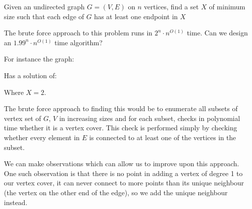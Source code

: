 \documentclass{article}
\begin{document}
\begin{definition}
  Given an undirected graph $G = (V,E)$ on $n$ vertices, find a set $X$ of minimum size such that each edge of $G$ has at least one endpoint in $X$
\end{definition}

The brute force approach to this problem runs in $2^{n}\cdot n^{O(1)}$ time. Can we design an $1.99^{n} \cdot n^{O(1)}$ time algorithm?

For instance the graph:


Has a solution of:


Where $X=2$.

The brute force approach to finding this would be to enumerate all subsets of vertex set of $G$, $V$ in increasing sizes and for each subset, checks in polynomial time whether it is a vertex cover. This check is performed simply by checking whether every element in $E$ is connected to at least one of the vertices in the subset.

We can make observations which can allow us to improve upon this approach. One such observation is that there is no point in adding a vertex of degree 1 to our vertex cover, it can never connect to more points than its unique neighbour (the vertex on the other end of the edge), so we add the unique neighbour instead.
\end{document}
